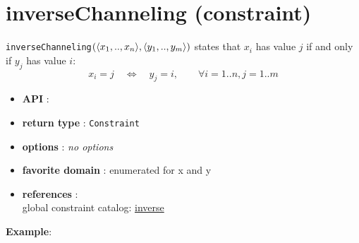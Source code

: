 \label{inversechanneling}
\hypertarget{inversechanneling}{}

\section{inverseChanneling (constraint)}\label{inversechanneling:inversechannelingconstraint}\hypertarget{inversechanneling:inversechannelingconstraint}{}
\begin{notedef}
  \texttt{inverseChanneling}$(\langle x_1,..,x_n\rangle,\langle y_1,..,y_m\rangle)$ states 
that $x_i$ has value $j$ if and only if $y_j$ has value $i$:
$$x_i = j\quad\iff\quad y_j = i,\qquad\forall i=1..n, j=1..m$$
\end{notedef}
\begin{itemize}
	\item \textbf{API} : 
	\item \textbf{return type} : \texttt{Constraint}
	\item \textbf{options} : \emph{no options}
	\item \textbf{favorite domain} : enumerated for x and y
	\item \textbf{references} :\\
      global constraint catalog: \href{http://www.emn.fr/x-info/sdemasse/gccat/Cinverse.html}{inverse}
\end{itemize}

\textbf{Example}:

